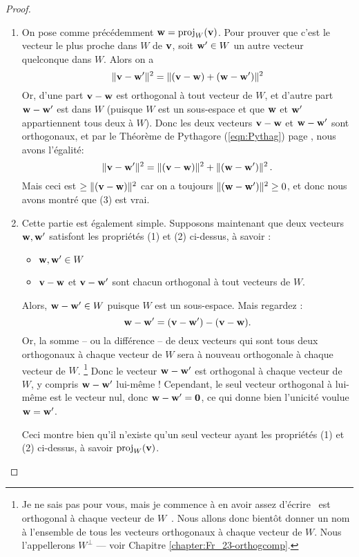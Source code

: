\begin{proof}
\begin{enumerate}[(1)]
puisque tous les autres produits scalaires entre $\ww_i$ et $\ww_j$ sont nuls ;
et ce dernier terme donne :
$$
 = \vv \cdot \ww_i - \frac{\vv\cdot \ww_i}{\Vert \ww_i\Vert^2}\Vert \ww_i \Vert^2 = 0\,.
$$
Ceci est vrai pour chaque $i = 1,2,\cdots, m$, et nous pouvons donc conclure que $\vv-\ww$ est orthogonal à tout vecteur de $W$, ce qui montre que (2) est vrai.


	\item On pose comme précédemment $\mathbf{w} = \operatorname{proj}_W(\mathbf{v})$.  Pour prouver que c'est le vecteur le plus proche
dans $W$ de $\mathbf{v}$, soit $\mathbf{w}' \in W$ un autre vecteur quelconque dans $W$.
Alors on a
$$
\Vert \mathbf{v}- \mathbf{w}' \Vert^2 = \Vert (\mathbf{v} - \mathbf{w}) + (\mathbf{w} - \mathbf{w}') \Vert^2
$$
Or, d'une part $\vv-\ww$ est orthogonal à tout vecteur de $W$, et d'autre part $\mathbf{w} - \mathbf{w}'$ est dans $W$ (puisque $W$ est un sous-espace et que $\mathbf{w}$ et $\mathbf{w}'$ appartiennent tous deux à $W$). Donc les deux vecteurs $\vv - \ww$ et $\mathbf{w} - \mathbf{w}'$
sont orthogonaux, et par le Théorème de Pythagore (\ref{eqn:Pythag}) page \pageref{eqn:Pythag}, nous avons l'égalité:
$$
\Vert \mathbf{v}- \mathbf{w}' \Vert^2 = \Vert (\mathbf{v} - \mathbf{w})\Vert^2 + \Vert(\mathbf{w} - \mathbf{w}') \Vert^2\,.
$$
Mais ceci est $\geq \Vert (\mathbf{v} - \mathbf{w})\Vert^2$
car on a toujours $ \Vert(\mathbf{w} - \mathbf{w}') \Vert^2\geq 0$, et donc nous avons montré que (3) est vrai.

	\item Cette partie est également simple. Supposons maintenant que deux vecteurs $\mathbf{w},\mathbf{w}'$ satisfont les propriétés (1) et (2) ci-dessus, à savoir :

\begin{itemize}
\item $\mathbf{w}, \mathbf{w}' \in W$
\item $\vv - \ww$ et $\mathbf{v}-\mathbf{w}'$ sont chacun orthogonal \`a tout vecteurs de $W$.
\end{itemize}

Alors, $\mathbf{w}- \mathbf{w}'\in W$ puisque $W$  est un sous-espace. Mais regardez : $$\mathbf{w}- \mathbf{w}'= (\mathbf{v}-\mathbf{w}')-(\mathbf{v} - \mathbf{w}).$$ Or, la somme -- ou la différence -- de deux vecteurs qui sont tous deux orthogonaux à chaque vecteur de $W$ sera à nouveau orthogonale à chaque vecteur de $W$. \footnote{Je ne sais pas pour vous, mais je commence à en avoir assez d'écrire \ \og est orthogonal à chaque vecteur de $W$\ \fg. Nous allons donc bientôt donner un nom à l'ensemble de tous les vecteurs orthogonaux à chaque vecteur de $W$. Nous l'appellerons $W^\perp$ --- voir Chapitre \ref{chapter:Fr_23-orthogcomp}.} Donc le vecteur $\mathbf{w}- \mathbf{w}'$ est orthogonal à chaque vecteur de $W$, y compris $\mathbf{w}- \mathbf{w}'$ lui-même ! Cependant, le seul vecteur orthogonal à lui-même est le vecteur nul, donc $\mathbf{w}- \mathbf{w}'=\mathbf{0}$, ce qui donne bien l'unicité voulue $\mathbf{w}= \mathbf{w}'$.

Ceci montre bien qu'il n'existe qu'un seul vecteur ayant les propriétés (1) et (2) ci-dessus, à savoir $\operatorname{proj}_W(\mathbf{v})$.
\end{enumerate}
\end{proof}

